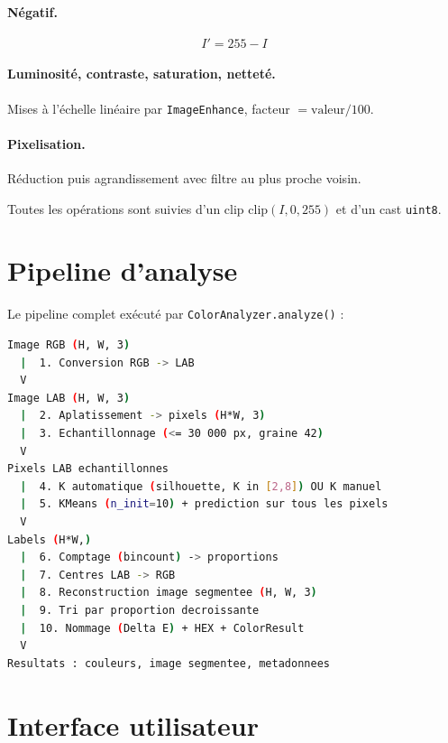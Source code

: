 \documentclass[11pt,a4paper]{article}
\begin{document}
\paragraph{Négatif.}
\begin{equation}
  I' = 255 - I
  \label{eq:invert}
\end{equation}

\paragraph{Luminosité, contraste, saturation, netteté.}
Mises à l'échelle linéaire par \texttt{ImageEnhance}, facteur
$= \text{valeur}/100$.

\paragraph{Pixelisation.}
Réduction puis agrandissement avec filtre au plus proche voisin.

Toutes les opérations sont suivies d'un clip
$\text{clip}(I, 0, 255)$ et d'un cast \texttt{uint8}.

\section{Pipeline d'analyse}

Le pipeline complet exécuté par \texttt{ColorAnalyzer.analyze()} :

\begin{lstlisting}[language=bash]
Image RGB (H, W, 3)
  |  1. Conversion RGB -> LAB
  V
Image LAB (H, W, 3)
  |  2. Aplatissement -> pixels (H*W, 3)
  |  3. Echantillonnage (<= 30 000 px, graine 42)
  V
Pixels LAB echantillonnes
  |  4. K automatique (silhouette, K in [2,8]) OU K manuel
  |  5. KMeans (n_init=10) + prediction sur tous les pixels
  V
Labels (H*W,)
  |  6. Comptage (bincount) -> proportions
  |  7. Centres LAB -> RGB
  |  8. Reconstruction image segmentee (H, W, 3)
  |  9. Tri par proportion decroissante
  |  10. Nommage (Delta E) + HEX + ColorResult
  V
Resultats : couleurs, image segmentee, metadonnees
\end{lstlisting}

\section{Interface utilisateur}
\end{document}
